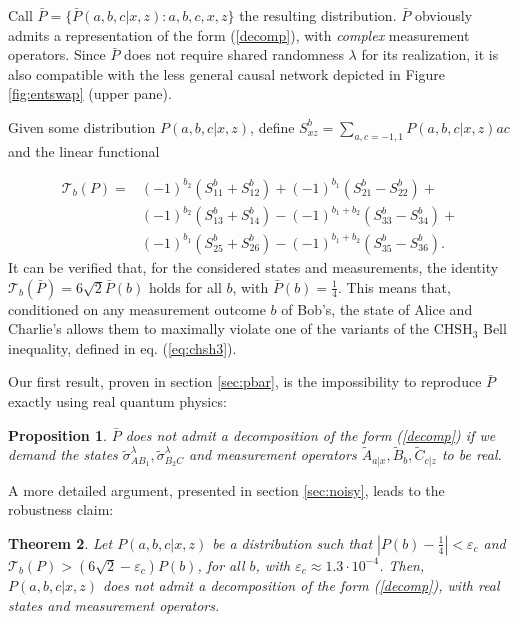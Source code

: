 \documentclass[onecolumn,prx,amsmath,amssymb,12pt]{revtex4-2}
\newtheorem{theo}{Theorem}
\newtheorem{prop}[theo]{Proposition}
\begin{document}
\begin{appendix}
Call $\bar{P}=\{\bar{P}(a,b,c|x,z):a,b,c,x,z\}$ the resulting distribution. $\bar{P}$ obviously admits a representation of the form (\ref{decomp}), with \emph{complex} measurement operators. Since $\bar{P}$ does not require shared randomness $\lambda$ for its realization, it is also compatible with the less general causal network depicted in Figure \ref{fig:entswap} (upper pane).


Given some distribution $P(a,b,c|x,z)$, define $S^b_{xz}=\sum_{a,c=-1,1}P(a,b,c|x,z)ac$ and the linear functional

\begin{align}
\mathscr{T}_b(P)=& (-1)^{b_2}(S_{11}^b+S^b_{12})+(-1)^{b_1}(S^b_{21}-S^b_{22})+\nonumber\\
&(-1)^{b_2}(S^b_{13}+S^b_{14})-(-1)^{b_1+b_2}(S^b_{33}-S^b_{34})+\nonumber\\
& (-1)^{b_1}(S^b_{25}+S^b_{26})-(-1)^{b_1+b_2}(S^b_{35}-S^b_{36}).
\label{adjusted_3CHSH}
\end{align}
It can be verified that, for the considered states and measurements, the identity $\mathscr{T}_b(\bar{P})=6\sqrt{2}\bar{P}(b)$ holds for all $b$, with $\bar{P}(b)=\frac{1}{4}$. This means that, conditioned on any measurement outcome $b$ of Bob's, the state of Alice and Charlie's allows them to maximally violate one of the variants of the $\text{CHSH}_3$ Bell inequality, defined in eq. (\ref{eq:chsh3}).

Our first result, proven in section \ref{sec:pbar}, is the impossibility to reproduce $\bar{P}$ exactly using real quantum physics:

\begin{prop}
\label{exact_case}
$\bar{P}$ does not admit a decomposition of the form (\ref{decomp}) if we demand the states $\tilde{\sigma}_{AB_1}^\lambda,\tilde{\sigma}_{B_2C}^\lambda$ and measurement operators $\tilde{A}_{a|x},\tilde{B}_{b},\tilde{C}_{c|z}$ to be real.
\end{prop}

A more detailed argument, presented in section \ref{sec:noisy}, leads to the robustness claim:

\begin{theo}
\label{approximate_case}
Let $P(a,b,c|x,z)$ be a distribution such that $|P(b)-\frac{1}{4}|< \varepsilon_c$ and $\mathscr{T}_b(P)>(6\sqrt{2}-\varepsilon_c)P(b)$, for all $b$, with $\varepsilon_c\approx 1.3\cdot 10^{-4}$. Then, $P(a,b,c|x,z)$ does not admit a decomposition of the form (\ref{decomp}), with real states and measurement operators.
\end{theo}


\end{appendix}
\end{document}
